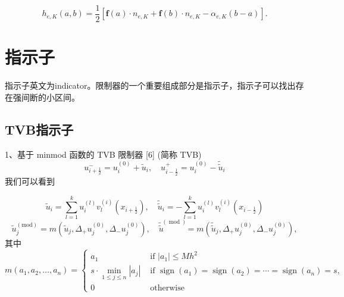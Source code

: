 \documentclass{article}
\numberwithin{equation}{subsection}    %
\begin{document}
\begin{equation}
    h_{e, K}(a, b)=\frac{1}{2}\left[\mathbf{f}(a) \cdot n_{e, K}+\mathbf{f}(b) \cdot n_{e, K}-\alpha_{e, K}(b-a)\right] .
\end{equation}
\section{指示子}
指示子英文为indicator。限制器的一个重要组成部分是指示子，指示子可以找出存在强间断的小区间。
\subsection{TVB指示子}
1、基于 minmod 函数的 TVB 限制器  [6]  (简称 TVB)
\begin{equation}
    u_{i+\frac{1}{2}}^{-}=u_{i}^{(0)}+\tilde{u}_{i}, \quad u_{i-\frac{1}{2}}^{+}=u_{i}^{(0)}-\tilde{\tilde{u}}_{i}
\end{equation}
我们可以看到

\begin{equation}
    \tilde{u}_{i}=\sum_{l=1}^{k} u_{i}^{(l)} v_{l}^{(i)}\left(x_{i+\frac{1}{2}}\right), \quad \tilde{\tilde{u}}_{i}=-\sum_{l=1}^{k} u_{i}^{(l)} v_{l}^{(i)}\left(x_{i-\frac{1}{2}}\right)
\end{equation}
\begin{equation}
    \tilde{u}_{j}^{(\mathrm{mod})}=m\left(\tilde{u}_{j}, \Delta_{+} u_{j}^{(0)}, \Delta_{-} u_{j}^{(0)}\right), \quad \tilde{\tilde{u}}^{(\bmod )}=m\left(\tilde{\tilde{u}}_{j}, \Delta_{+} u_{j}^{(0)}, \Delta_{-} u_{j}^{(0)}\right),
\end{equation}
其中
\begin{equation}
    m\left(a_{1}, a_{2}, \ldots, a_{n}\right)=\begin{cases}
        a_{1}                                             & \text { if }\left|a_{1}\right| \leq M h^{2}                                                                                              \\
        s \cdot \min _{1 \leq j \leq n}\left|a_{j}\right| & \text { if } \operatorname{sign}\left(a_{1}\right)=\operatorname{sign}\left(a_{2}\right)=\cdots=\operatorname{sign}\left(a_{n}\right)=s, \\
        0                                                 & \text { otherwise }
    \end{cases}
\end{equation}
\end{document}
